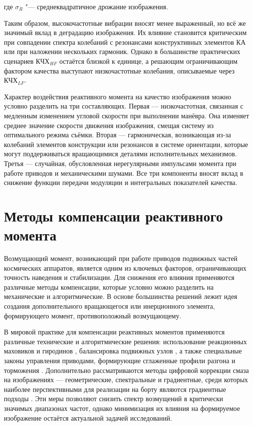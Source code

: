 \noindent где \(\sigma_R\) "--- среднеквадратичное дрожание изображения.


Таким образом, высокочастотные вибрации вносят менее выраженный, но всё же значимый вклад в деградацию изображения. Их влияние становится критическим при совпадении спектра колебаний с резонансами конструктивных элементов КА или при наложении нескольких гармоник. Однако в большинстве практических сценариев $\text{КЧХ}_{HF}$ остаётся близкой к единице, а решающим ограничивающим фактором качества выступают низкочастотные колебания, описываемые через $\text{КЧХ}_{LF}$.

Характер воздействия реактивного момента на качество изображения можно условно разделить на три составляющих. Первая — низкочастотная, связанная с медленным изменением угловой скорости при выполнении манёвра. Она изменяет среднее значение скорости движения изображения, смещая систему из оптимального режима съёмки. Вторая — гармоническая, возникающая из-за колебаний элементов конструкции или резонансов в системе ориентации, которые могут поддерживаться вращающимися деталями исполнительных механизмов. Третья — случайная, обусловленная нерегулярными импульсами момента при работе приводов и механическими шумами. Все три компоненты вносят вклад в снижение функции передачи модуляции и интегральных показателей качества.

\section{Методы компенсации реактивного момента}
Возмущающий момент, возникающий при работе приводов подвижных частей космических аппаратов, является одним из ключевых факторов, ограничивающих точность наведения и стабилизации. Для снижения его влияния применяются различные методы компенсации, которые условно можно разделить на механические и алгоритмические. В основе большинства решений лежит идея создания дополнительного вращающегося или инерционного элемента, формирующего момент, противоположный возмущающему.

В мировой практике для компенсации реактивных моментов применяются различные технические и алгоритмические решения: использование реакционных маховиков и гиродинов \cite{pittelkau2012pointing, dennehy2021spacecraft}, балансировка подвижных узлов \cite{alvarez2018spacecraft}, а также специальные законы управления приводами, формирующие сглаженные профили разгона и торможения \cite{lappas2002attitude, zhao2023effect}. Дополнительно рассматриваются методы цифровой коррекции смаза на изображениях — геометрические, спектральные и градиентные, среди которых наиболее перспективными для реализации на борту являются градиентные подходы \cite{volobuev2021dissertation}. Эти меры позволяют снизить спектр возмущений в критически значимых диапазонах частот, однако минимизация их влияния на формируемое изображение остаётся актуальной задачей исследований.

